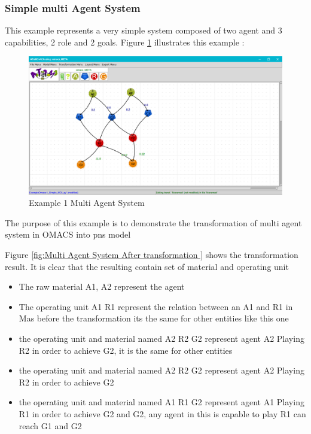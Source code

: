 \subsubsection{Simple multi Agent System }
This example represents a very simple system composed of  two agent and 3 capabilities, 2 role and 2 goals.
 Figure \ref{fig:Example 1 Multi Agent System } illustrates this example :
\begin{figure}[th]
	\centering
 	\includegraphics[scale=0.3]{ch3/img/omacs_model}
	\caption{\label{fig:Example 1 Multi Agent System }Example 1 Multi Agent System}
\end{figure} 
\pagebreak
The purpose of this example is to demonstrate the transformation of multi agent system in OMACS into pns model

Figure \ref{fig:Multi Agent System After transformation } shows the transformation result.
It is clear that the resulting contain set of material and operating unit
 
\begin{itemize}
\item The raw material A1, A2 represent the agent  
\item The operating unit A1 R1 represent the relation between an A1 and R1 
in Mas before the transformation its the same for other entities like this one
\item the operating unit and material named A2 R2 G2 represent agent A2 Playing R2 in order to achieve G2, it is the same for other entities  

\item the operating unit and material named A2 R2 G2 represent agent A2 Playing R2 in order to achieve G2 


\item the operating unit and material named A1 R1 G2 represent agent A1 Playing R1 in order to achieve G2  and G2, any agent in this is capable to play R1 can reach G1 and G2
 

\end{itemize}
  


